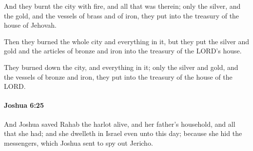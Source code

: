 			\begin{versebox}
					\item[BHS] 
					\item[ASV] And they burnt the city with fire, and all that was therein; only the silver, and the gold, and the vessels of brass and of iron, they put into the treasury of the house of Jehovah.
					\item[NIV] Then they burned the whole city and everything in it, but they put the silver and gold and the articles of bronze and iron into the treasury of the LORD’s house.
					\item[NRSV] They burned down the city, and everything in it; only the silver and gold, and the vessels of bronze and iron, they put into the treasury of the house of the LORD.
			\end{versebox}

		\paragraph{Joshua 6:25} %
			\label{JOSHUA-6-25}

			And Joshua saved Rahab the harlot alive, and her father’s household, and all that she had; and she dwelleth in Israel even unto this day; because she hid the messengers, which Joshua sent to spy out Jericho.

